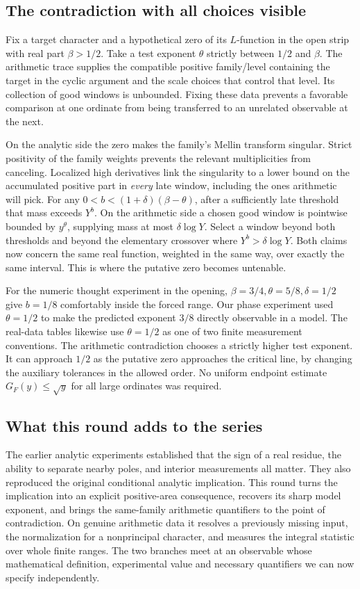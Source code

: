 \documentclass[12pt,letterpaper]{article}
\begin{document}
\subsection{The contradiction with all choices visible}
Fix a target character and a hypothetical zero of its \(L\)-function in the open strip with real part \(\beta>1/2\). Take a test exponent \(\theta\) strictly between \(1/2\) and \(\beta\). The arithmetic trace supplies the compatible positive family/level containing the target in the cyclic argument and the scale choices that control that level. Its collection of good windows is unbounded. Fixing these data prevents a favorable comparison at one ordinate from being transferred to an unrelated observable at the next.

On the analytic side the zero makes the family's Mellin transform singular. Strict positivity of the family weights prevents the relevant multiplicities from canceling. Localized high derivatives link the singularity to a lower bound on the accumulated positive part in \emph{every} late window, including the ones arithmetic will pick. For any \(0<b<(1+\delta)(\beta-\theta)\), after a sufficiently late threshold that mass exceeds \(Y^b\). On the arithmetic side a chosen good window is pointwise bounded by \(y^\theta\), supplying mass at most \(\delta\log Y\). Select a window beyond both thresholds and beyond the elementary crossover where \(Y^b>\delta\log Y\). Both claims now concern the same real function, weighted in the same way, over exactly the same interval. This is where the putative zero becomes untenable.

For the numeric thought experiment in the opening, \(\beta=3/4,\theta=5/8,\delta=1/2\) give \(b=1/8\) comfortably inside the forced range. Our phase experiment used \(\theta=1/2\) to make the predicted exponent \(3/8\) directly observable in a model. The real-data tables likewise use \(\theta=1/2\) as one of two finite measurement conventions. The arithmetic contradiction chooses a strictly higher test exponent. It can approach \(1/2\) as the putative zero approaches the critical line, by changing the auxiliary tolerances in the allowed order. No uniform endpoint estimate \(G_F(y)\le \sqrt y\) for all large ordinates was required.

\subsection{What this round adds to the series}
The earlier analytic experiments established that the sign of a real residue, the ability to separate nearby poles, and interior measurements all matter. They also reproduced the original conditional analytic implication. This round turns the implication into an explicit positive-area consequence, recovers its sharp model exponent, and brings the same-family arithmetic quantifiers to the point of contradiction. On genuine arithmetic data it resolves a previously missing input, the normalization for a nonprincipal character, and measures the integral statistic over whole finite ranges. The two branches meet at an observable whose mathematical definition, experimental value and necessary quantifiers we can now specify independently.
\end{document}
